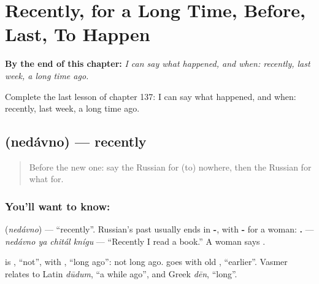 
\chapter{Recently, for a Long Time, Before, Last, To Happen}
\label{ch:ru-recently-for-a-long-time-before-last-to-happen}

\begin{chapteropening}
\textbf{By the end of this chapter:} \emph{I can say what happened, and when: recently, last week, a long time ago.}

Complete the last lesson of chapter 137: I can say what happened, and when: recently, last week, a long time ago.
\end{chapteropening}

\section[\texorpdfstring{\ru{недавно} (nedávno)}{недавно (nedávno)}]{ (nedávno) — recently}

\label{lesson:RU-C137-nedavno}



\begin{quote}
Before the new one: say the Russian for (to) nowhere, then the Russian for what for.
\end{quote}

\subsection*{You'll want to know: }
\textbf{} (\emph{nedávno}) — \textquotedblleft{}recently\textquotedblright{}. Russian's past usually ends in \textbf{-}, with \textbf{-} for a woman: \textbf{   .} — \emph{nedávno ya chitál knígu} — \textquotedblleft{}Recently I read a book.\textquotedblright{} A woman says \textbf{}.

\begin{cousinweb}
\textbf{} is \emph{}, \textquotedblleft{}not\textquotedblright{}, with \emph{}, \textquotedblleft{}long ago\textquotedblright{}: not long ago. \emph{} goes with old \emph{}, \textquotedblleft{}earlier\textquotedblright{}. Vasmer relates \emph{} to Latin \emph{dūdum}, \textquotedblleft{}a while ago\textquotedblright{}, and Greek \emph{dēn}, \textquotedblleft{}long\textquotedblright{}.
\end{cousinweb}


